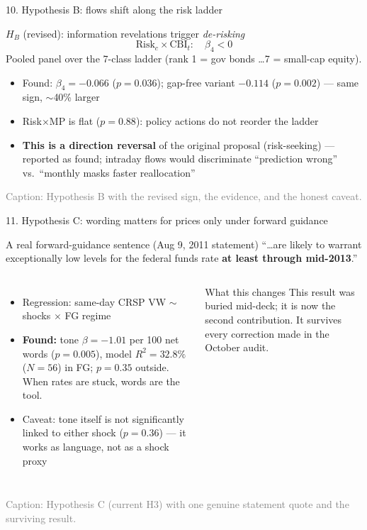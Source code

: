 \documentclass[aspectratio=169, 11pt]{beamer}
\newenvironment{ablock}[1]{\begin{block}{#1}}{\end{block}}
\newenvironment{aalertblock}[1]{\begin{alertblock}{#1}}{\end{alertblock}}
\newenvironment{agreenblock}[1]{\begin{exampleblock}{#1}}{\end{exampleblock}}
\begin{document}
\begin{frame}{10. Hypothesis B: flows shift along the risk ladder}
  \begin{aalertblock}{$H_B$ (revised): information revelations trigger \emph{de-risking}}
    \begin{equation}
      \mathrm{Risk}_{c}\times \mathrm{CBI}_t: \quad \beta_4 < 0
    \end{equation}
    Pooled panel over the 7-class ladder (rank 1 = gov bonds \ldots 7 = small-cap equity).
  \end{aalertblock}
  \begin{itemize}
    \item Found: $\beta_4 = -0.066$ ($p = 0.036$); gap-free variant $-0.114$ ($p=0.002$) --- same sign, $\sim$40\% larger
    \item Risk$\times$MP is flat ($p=0.88$): policy actions do not reorder the ladder
    \item \textbf{This is a direction reversal} of the original proposal (risk-seeking) --- reported as found; intraday flows would discriminate ``prediction wrong'' vs.\ ``monthly masks faster reallocation''
  \end{itemize}
  {\scriptsize\textcolor{gray}{Caption: Hypothesis B with the revised sign, the evidence, and the honest caveat.}}
\end{frame}

\begin{frame}{11. Hypothesis C: wording matters for prices only under forward guidance}
  \begin{agreenblock}{A real forward-guidance sentence (Aug 9, 2011 statement)}
    ``\ldots are likely to warrant exceptionally low levels for the federal funds rate \textbf{at least through
    mid-2013}.''
  \end{agreenblock}
  \begin{columns}[T]
    \begin{itemize}
      \item Regression: same-day CRSP VW $\sim$ shocks $\times$ FG regime
      \item \textbf{Found:} tone $\beta = -1.01$ per 100 net words ($p=0.005$), model $R^2 = 32.8\%$ ($N=56$) in
            FG; $p=0.35$ outside. When rates are stuck, words are the tool.
      \item Caveat: tone itself is not significantly linked to either shock ($p=0.36$) --- it works as language,
            not as a shock proxy
    \end{itemize}
    \begin{ablock}{What this changes}
      This result was buried mid-deck; it is now the second contribution. It survives every correction made in
      the October audit.
    \end{ablock}
  \end{columns}
  {\scriptsize\textcolor{gray}{Caption: Hypothesis C (current H3) with one genuine statement quote and the surviving result.}}
\end{frame}
\end{document}
